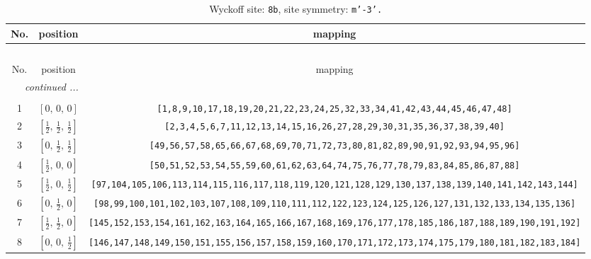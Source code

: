 \documentclass[fleqn,8pt]{jsarticle}
\begin{document}
\renewcommand{\arraystretch}{1.2}
\begin{longtable}{ccc}
\caption{Wyckoff site: {\tt 8b}, site symmetry: {\tt m'-3'.}}
 \\
 \hline \hline
No. & position & mapping \\ \hline \endfirsthead

\multicolumn{2}{l}{\tablename\ \thetable{}} \\
 \hline \hline
No. & position & mapping \\ \hline \endhead

 \hline \hline
\multicolumn{2}{r}{\footnotesize\it continued ...} \\ \endfoot

 \hline \hline
\multicolumn{2}{r}{} \\ \endlastfoot

1 & $\left[ 0,\, 0,\, 0 \right]$ & {\tt [1,8,9,10,17,18,19,20,21,22,23,24,25,32,33,34,41,42,43,44,45,46,47,48]} \\ \hline
2 & $\left[ \frac{1}{2},\, \frac{1}{2},\, \frac{1}{2} \right]$ & {\tt [2,3,4,5,6,7,11,12,13,14,15,16,26,27,28,29,30,31,35,36,37,38,39,40]} \\ \hline
3 & $\left[ 0,\, \frac{1}{2},\, \frac{1}{2} \right]$ & {\tt [49,56,57,58,65,66,67,68,69,70,71,72,73,80,81,82,89,90,91,92,93,94,95,96]} \\ \hline
4 & $\left[ \frac{1}{2},\, 0,\, 0 \right]$ & {\tt [50,51,52,53,54,55,59,60,61,62,63,64,74,75,76,77,78,79,83,84,85,86,87,88]} \\ \hline
5 & $\left[ \frac{1}{2},\, 0,\, \frac{1}{2} \right]$ & {\tt [97,104,105,106,113,114,115,116,117,118,119,120,121,128,129,130,137,138,139,140,141,142,143,144]} \\ \hline
6 & $\left[ 0,\, \frac{1}{2},\, 0 \right]$ & {\tt [98,99,100,101,102,103,107,108,109,110,111,112,122,123,124,125,126,127,131,132,133,134,135,136]} \\ \hline
7 & $\left[ \frac{1}{2},\, \frac{1}{2},\, 0 \right]$ & {\tt [145,152,153,154,161,162,163,164,165,166,167,168,169,176,177,178,185,186,187,188,189,190,191,192]} \\ \hline
8 & $\left[ 0,\, 0,\, \frac{1}{2} \right]$ & {\tt [146,147,148,149,150,151,155,156,157,158,159,160,170,171,172,173,174,175,179,180,181,182,183,184]} \\
\end{longtable}
\renewcommand{\arraystretch}{1.2}
\end{document}
